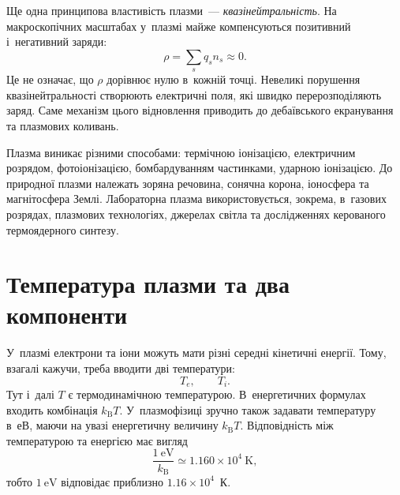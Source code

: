 Ще одна принципова властивість плазми~--- \emph{квазінейтральність}. На макроскопічних масштабах у~плазмі майже компенсуються позитивний і~негативний заряди:
\begin{equation}
	\rho = \sum_s q_s n_s \approx 0.
\end{equation}
Це не означає, що $\rho$ дорівнює нулю в~кожній точці. Невеликі порушення квазінейтральності створюють електричні поля, які швидко перерозподіляють заряд. Саме механізм цього відновлення приводить до дебаївського екранування та плазмових коливань.

Плазма виникає різними способами: термічною іонізацією, електричним розрядом, фотоіонізацією, бомбардуванням частинками, ударною іонізацією. До природної плазми належать зоряна речовина, сонячна корона, іоносфера та магнітосфера Землі. Лабораторна плазма використовується, зокрема, в~газових розрядах, плазмових технологіях, джерелах світла та дослідженнях керованого термоядерного синтезу.



\section{Температура плазми та два компоненти}



У~плазмі електрони та іони можуть мати різні середні кінетичні енергії. Тому, взагалі кажучи, треба вводити дві температури:
\begin{equation}
	T_e,\qquad T_i.
\end{equation}
Тут і~далі $T$ є термодинамічною температурою. В~енергетичних формулах входить комбінація $k_{\mathrm B}T$. У~плазмофізиці зручно також задавати температуру в~еВ, маючи на увазі енергетичну величину $k_{\mathrm B}T$. Відповідність між температурою та енергією має вигляд
\begin{equation}
	\frac{1~\mathrm{eV}}{k_{\mathrm B}}
	\simeq 1.160\times10^4~\mathrm{K},
\end{equation}
тобто $1~\mathrm{eV}$ відповідає приблизно $1.16\times10^4$~К.

